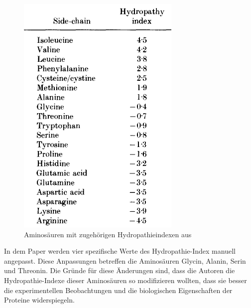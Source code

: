 \documentclass[german,version-2022-01]{uzl-thesis}
\begin{document}
\begin{figure}[htpb]
  \centering
  \includegraphics[scale=0.75]{Images/Hydropathy_scores_Paper.png}
  \caption{Aminos\"auren mit zugeh\"origen Hydropathieindexen aus  \cite{kyte_simple_1982}}
  \label{fig:Hydropathieindexe}
\end{figure}
In dem Paper  \cite{kyte_simple_1982} werden vier spezifische Werte des Hydropathie-Index manuell angepasst. Diese Anpassungen betreffen die Aminos\"auren Glycin, Alanin, Serin und Threonin. Die Gr\"unde f\"ur diese \"Anderungen sind, dass die Autoren die Hydropathie-Indexe dieser Aminos\"auren so modifizieren wollten, dass sie besser die experimentellen Beobachtungen und die biologischen Eigenschaften der Proteine widerspiegeln.
\end{document}
